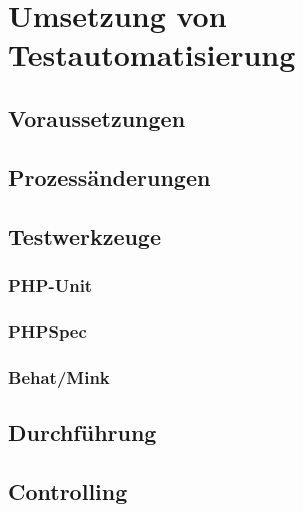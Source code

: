 \newpage
\section{Umsetzung von Testautomatisierung}

\subsection{Voraussetzungen}

\subsection{Prozessänderungen}

\subsection{Testwerkzeuge}
\subsubsection{PHP-Unit}
\subsubsection{PHPSpec}
\subsubsection{Behat/Mink}

\subsection{Durchführung}

\subsection{Controlling}